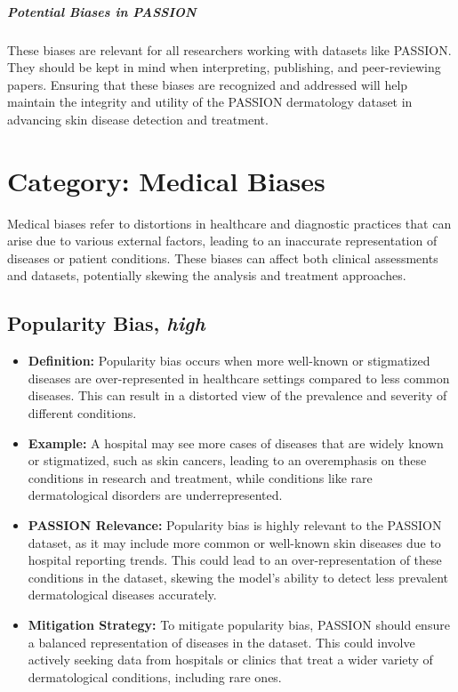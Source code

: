 \begin{refsection}
	\subparagraph{Potential Biases in PASSION}
	These biases are relevant for all researchers working with datasets like PASSION. They should be kept in mind when interpreting, publishing, and peer-reviewing papers. Ensuring that these biases are recognized and addressed will help maintain the integrity and utility of the PASSION dermatology dataset in advancing skin disease detection and treatment.
		
		
		\section{\textbf{Category:} Medical Biases}
		Medical biases refer to distortions in healthcare and diagnostic practices that can arise due to various external factors, leading to an inaccurate representation of diseases or patient conditions. These biases can affect both clinical assessments and datasets, potentially skewing the analysis and treatment approaches.
		
		\subsection{Popularity Bias, \textit{high}}
		\begin{itemize}
			\item \textbf{Definition:} Popularity bias occurs when more well-known or stigmatized diseases are over-represented in healthcare settings compared to less common diseases. This can result in a distorted view of the prevalence and severity of different conditions.
			\item \textbf{Example:} A hospital may see more cases of diseases that are widely known or stigmatized, such as skin cancers, leading to an overemphasis on these conditions in research and treatment, while conditions like rare dermatological disorders are underrepresented.
			\item \textbf{PASSION Relevance:} Popularity bias is highly relevant to the PASSION dataset, as it may include more common or well-known skin diseases due to hospital reporting trends. This could lead to an over-representation of these conditions in the dataset, skewing the model's ability to detect less prevalent dermatological diseases accurately.
			\item \textbf{Mitigation Strategy:} To mitigate popularity bias, PASSION should ensure a balanced representation of diseases in the dataset. This could involve actively seeking data from hospitals or clinics that treat a wider variety of dermatological conditions, including rare ones.
		\end{itemize}
		

\end{refsection}
